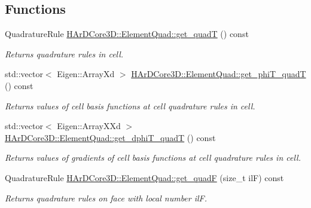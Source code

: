 \subsection*{Functions}
\begin{DoxyCompactItemize}
\item 
\mbox{\label{group__HybridCore_ga9676c87f42764a058c9d7aecd2ce44cd}} 
Quadrature\+Rule \hyperlink{group__HybridCore_ga9676c87f42764a058c9d7aecd2ce44cd}{H\+Ar\+D\+Core3\+D\+::\+Element\+Quad\+::get\+\_\+quadT} () const
\begin{DoxyCompactList}\small\item\em Returns quadrature rules in cell. \end{DoxyCompactList}\item 
\mbox{\label{group__HybridCore_gaafce6cb00f061fe1159a9972b73d3bb9}} 
std\+::vector$<$ Eigen\+::\+Array\+Xd $>$ \hyperlink{group__HybridCore_gaafce6cb00f061fe1159a9972b73d3bb9}{H\+Ar\+D\+Core3\+D\+::\+Element\+Quad\+::get\+\_\+phi\+T\+\_\+quadT} () const
\begin{DoxyCompactList}\small\item\em Returns values of cell basis functions at cell quadrature rules in cell. \end{DoxyCompactList}\item 
\mbox{\label{group__HybridCore_gab0450891cb0d96686256c31e87948374}} 
std\+::vector$<$ Eigen\+::\+Array\+X\+Xd $>$ \hyperlink{group__HybridCore_gab0450891cb0d96686256c31e87948374}{H\+Ar\+D\+Core3\+D\+::\+Element\+Quad\+::get\+\_\+dphi\+T\+\_\+quadT} () const
\begin{DoxyCompactList}\small\item\em Returns values of gradients of cell basis functions at cell quadrature rules in cell. \end{DoxyCompactList}\item 
\mbox{\label{group__HybridCore_ga7eb693a2f8d58d04b0e653cb952e59f2}} 
Quadrature\+Rule \hyperlink{group__HybridCore_ga7eb693a2f8d58d04b0e653cb952e59f2}{H\+Ar\+D\+Core3\+D\+::\+Element\+Quad\+::get\+\_\+quadF} (size\+\_\+t ilF) const
\begin{DoxyCompactList}\small\item\em Returns quadrature rules on face with local number ilF. \end{DoxyCompactList}\item 

\end{DoxyCompactItemize}
